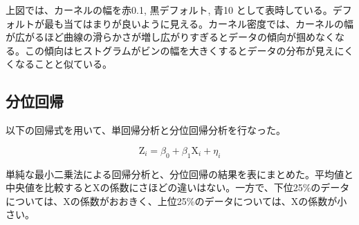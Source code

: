 \documentclass[a4paper]{jsarticle}
\begin{document}
上図では、カーネルの幅を赤0.1, 黒デフォルト, 青10 として表時している。デフォルトが最も当てはまりが良いように見える。カーネル密度では、カーネルの幅が広がるほど曲線の滑らかさが増し広がりすぎるとデータの傾向が掴めなくなる。この傾向はヒストグラムがビンの幅を大きくするとデータの分布が見えにくくなることと似ている。

\subsection{分位回帰}

以下の回帰式を用いて、単回帰分析と分位回帰分析を行なった。

\begin{displaymath}
  \text{Z}_i = \beta_0 + \beta_1 \text{X}_i + \eta_i
\end{displaymath}

\begin{figure}[H]
  \centering
  
\end{figure}

単純な最小二乗法による回帰分析と、分位回帰の結果を表にまとめた。平均値と中央値を比較するとXの係数にさほどの違いはない。一方で、下位25\%のデータについては、Xの係数がおおきく、上位25\%のデータについては、Xの係数が小さい。
\end{document}
